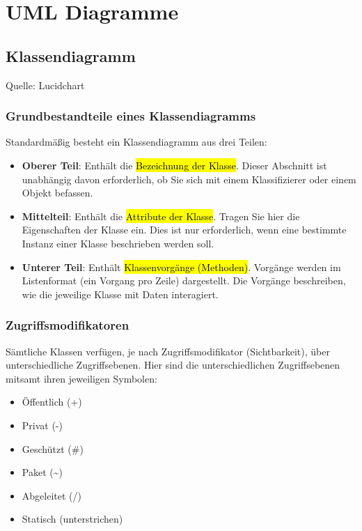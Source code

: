 \section{UML Diagramme}
\label{sec:UMLDiagramme}

\subsection{Klassendiagramm}
\label{sec:Klassendiagramm}

Quelle: Lucidchart \cite{LucidchartKlassendiagramm}

\subsubsection{Grundbestandteile eines Klassendiagramms}
Standardmäßig besteht ein Klassendiagramm aus drei Teilen:

\begin{itemize}
	\item \textbf{Oberer Teil}: Enthält die \hl{Bezeichnung der Klasse}. Dieser Abschnitt ist unabhängig davon erforderlich, ob Sie sich mit einem Klassifizierer oder einem Objekt befassen.
	\item \textbf{Mittelteil}: Enthält die \hl{Attribute der Klasse}. Tragen Sie hier die Eigenschaften der Klasse ein. Dies ist nur erforderlich, wenn eine bestimmte Instanz einer Klasse beschrieben werden soll.
	\item \textbf{Unterer Teil}: Enthält \hl{Klassenvorgänge (Methoden)}. Vorgänge werden im Listenformat (ein Vorgang pro Zeile) dargestellt. Die Vorgänge beschreiben, wie die jeweilige Klasse mit Daten interagiert.
\end{itemize}

\subsubsection{Zugriffsmodifikatoren}
Sämtliche Klassen verfügen, je nach Zugriffsmodifikator (Sichtbarkeit), über unterschiedliche Zugriffsebenen. Hier sind die unterschiedlichen Zugriffsebenen mitsamt ihren jeweiligen Symbolen:

\begin{multicols}{2}
	\begin{itemize}
		\item Öffentlich (+)
		\item Privat (-)
		\item Geschützt (\#)
		\item Paket (\textasciitilde)
		\item Abgeleitet (/)
		\item Statisch (unterstrichen)
	\end{itemize}
\end{multicols}

